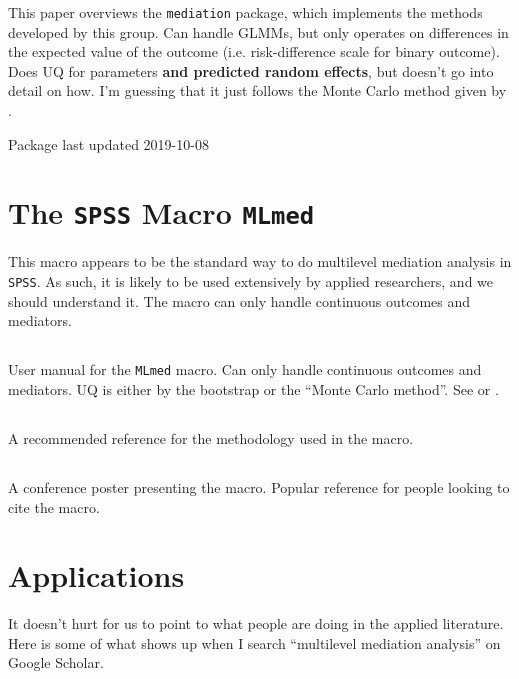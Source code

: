 \documentclass{article}
\begin{document}
This paper overviews the \texttt{mediation} package, which implements the methods developed by this group. Can handle GLMMs, but only operates on differences in the expected value of the outcome (i.e. risk-difference scale for binary outcome). Does UQ for parameters \textbf{and predicted random effects}, but doesn't go into detail on how. I'm guessing that it just follows the Monte Carlo method given by \citet{Ima10I}.

Package last updated 2019-10-08

\section{The \texttt{SPSS} Macro \texttt{MLmed}}
\label{sec:MLmed}

This macro appears to be the standard way to do multilevel mediation analysis in \texttt{SPSS}. As such, it is likely to be used extensively by applied researchers, and we should understand it. The macro can only handle continuous outcomes and mediators.

\subsection{\citet{Roc19}}

User manual for the \texttt{MLmed} macro. Can only handle continuous outcomes and mediators. UQ is either by the bootstrap or the ``Monte Carlo method''. See \citet{Pre12} or \citet{Wil08}.

\subsection{\citet{Hay20}}

A recommended reference for the methodology used in the macro.

\subsection{\citet{Roc17}}

A conference poster presenting the macro. Popular reference for people looking to cite the macro.


\section{Applications}

It doesn't hurt for us to point to what people are doing in the applied literature. Here is some of what shows up when I search ``multilevel mediation analysis'' on Google Scholar.
\end{document}
